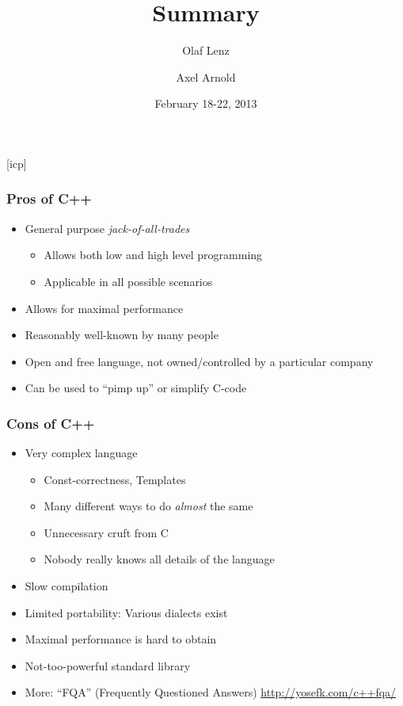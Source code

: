 \documentclass{slides}
\begin{document}
\graphicspath{{figures/}}

\title[Summary]{\Large Summary}

\author[O. Lenz and A. Arnold]{Olaf Lenz \and Axel Arnold} 
\date{February 18-22, 2013}

\begin{frame}
  \titlepage
\end {frame}
[icp]

\begin{frame}
  \frametitle{Pros of C++}
  \begin{itemize}
  \item General purpose \emph{jack-of-all-trades}
    \begin{itemize}
    \item Allows both low and high level programming
    \item Applicable in all possible scenarios
    \end{itemize}
  \item Allows for maximal performance
  \item Reasonably well-known by many people
  \item Open and free language, not owned/controlled by a particular
    company
  \item Can be used to ``pimp up'' or simplify C-code
  \end{itemize}
\end{frame}

\begin{frame}
  \frametitle{Cons of C++}
  \begin{itemize}
  \item Very complex language
    \begin{itemize}
    \item Const-correctness, Templates
    \item Many different ways to do \emph{almost} the same
    \item Unnecessary cruft from C
    \item Nobody really knows all details of the language
    \end{itemize}
  \item Slow compilation
  \item Limited portability: Various dialects exist
  \item Maximal performance is hard to obtain
  \item Not-too-powerful standard library
  \item More: ``FQA'' (Frequently Questioned Answers) \url{http://yosefk.com/c++fqa/}
  \end{itemize}
\end{frame}
\end{document}
